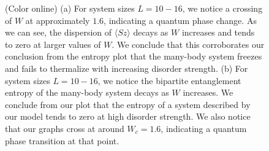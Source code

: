 \documentclass[prl,aps,epsf,showpacs,twocolumn]{revtex4}
\begin{document}
\begin{figure}
  \caption{(Color online) (a) For system sizes $L = 10-16$, we notice a crossing
    of $W$ at approximately $1.6$, indicating a quantum phase change. As we can
    see, the dispersion of $\langle Sz \rangle$ decays as $W$ increases and
    tends to zero at larger values of $W$. We conclude that this corroborates
    our conclusion from the entropy plot that the many-body system freezes and
    fails to thermalize with increasing disorder strength.  (b) For system sizes
    $L = 10-16$, we notice the bipartite entanglement entropy of the many-body
    system decays as $W$ increases. We conclude from our plot that the entropy
    of a system described by our model tends to zero at high disorder strength.
    We also notice that our graphs cross at around $W_c=1.6$, indicating a
    quantum phase transition at that point.
  }
\label{fig1}
\end{figure}
\end{document}
